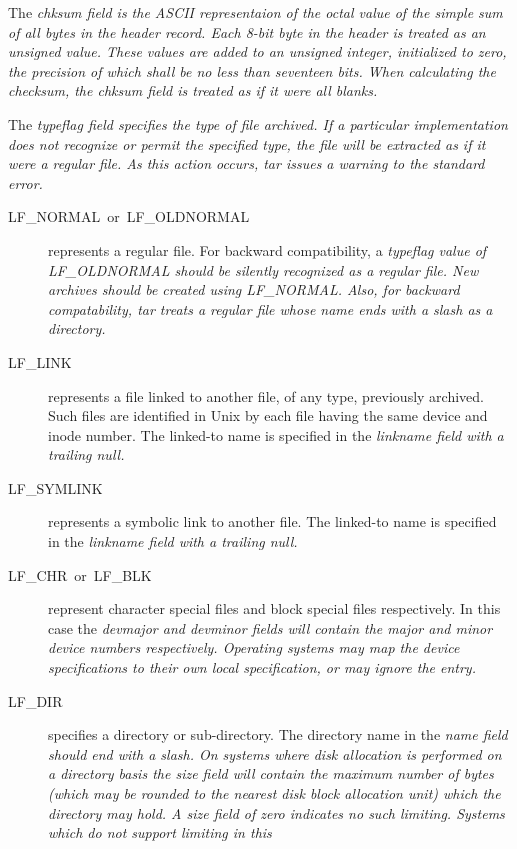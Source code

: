 The %
\it chksum \rm%
 field is the ASCII representaion of the octal value of the
simple sum of all bytes in the header record.  Each 8-bit byte in the
header is treated as an unsigned value.  These values are added to an
unsigned integer, initialized to zero, the precision of which shall be no
less than seventeen bits.  When calculating the checksum, the %
\it chksum \rm field is treated as if it were all blanks.

The %
\it typeflag \rm%
 field specifies the type of file archived.  If a particular
implementation does not recognize or permit the specified type, the file
will be extracted as if it were a regular file.  As this action occurs,
%
\it tar \rm%
 issues a warning to the standard error.
\begin{description}
\item[{LF\_NORMAL\ or\ LF\_OLDNORMAL}]
represents a regular file.
For backward compatibility, a %
\it typeflag \rm%
 value of LF\_OLDNORMAL
should be silently recognized as a regular file.  New archives should
be created using LF\_NORMAL.
Also, for backward
compatability, %
\it tar \rm%
 treats a regular file whose name ends
with a slash as a directory.
\item[{LF\_LINK}]
represents a file linked to another file, of any type,
previously archived.  Such files are identified in Unix by each file
having the same device and inode number.  The linked-to
name is specified in the %
\it linkname \rm%
 field with a trailing null.
\item[{LF\_SYMLINK}]
represents a symbolic link to another file.  The linked-to
name is specified in the %
\it linkname \rm%
 field with a trailing null.
\item[{LF\_CHR\ or\ LF\_BLK}]
represent character special files and block
special files respectively.
In this case the %
\it devmajor \rm%
 and %
\it devminor \rm fields will contain the
major and minor device numbers respectively.  Operating
systems may map the device specifications to their own local
specification, or may ignore the entry.
\item[{LF\_DIR}]
specifies a directory or sub-directory.  The directory name
in the %
\it name \rm%
 field should end with a slash.
On systems where
disk allocation is performed on a directory basis the %
\it size \rm field will contain the maximum number of bytes (which may be
rounded to the nearest disk block allocation unit) which the
directory may hold.  A %
\it size \rm%
 field of zero indicates no such
limiting.  Systems which do not support limiting in this

\end{description}
